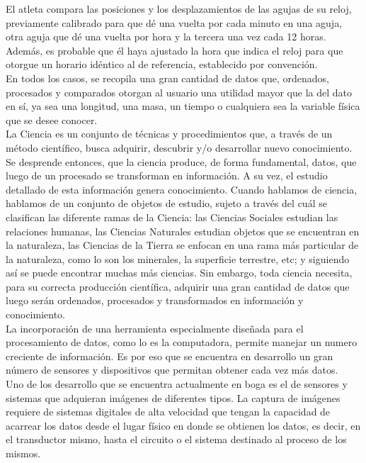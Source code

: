 El atleta compara las posiciones y los desplazamientos de las agujas de su reloj, previamente calibrado para que dé una vuelta por cada minuto en una aguja, otra aguja que dé una vuelta por hora y la tercera una vez cada 12 horas. Además, es probable que él haya ajustado la hora que indica el reloj para que otorgue un horario idéntico al de referencia, establecido por convención.\\

En todos los casos, se recopila una gran cantidad de datos que, ordenados, procesados y comparados otorgan al usuario una utilidad mayor que la del dato en sí, ya sea una longitud, una masa, un tiempo o cualquiera sea la variable física que se desee conocer.\\

La Ciencia es un conjunto de técnicas y procedimientos que, a través de un método científico, busca adquirir, descubrir y/o desarrollar nuevo conocimiento. Se desprende entonces, que la ciencia produce, de forma fundamental, datos, que luego de un procesado se transforman en información. A su vez, el estudio detallado de esta información genera conocimiento. Cuando hablamos de ciencia, hablamos de un conjunto de objetos de estudio, sujeto a través del cuál se clasifican las diferente ramas de la Ciencia: las Ciencias Sociales estudian las relaciones humanas, las Ciencias Naturales estudian objetos que se encuentran en la naturaleza, las Ciencias de la Tierra se enfocan en una rama más particular de la naturaleza, como lo son los minerales, la superficie terrestre, etc; y siguiendo así se puede encontrar muchas más ciencias. Sin embargo, toda ciencia necesita, para su correcta producción científica, adquirir una gran cantidad de datos que luego serán ordenados, procesados y transformados en información y conocimiento.\\

La incorporación de una herramienta especialmente diseñada para el procesamiento de datos, como lo es la computadora, permite manejar un numero creciente de información.
Es por eso que se encuentra en desarrollo un gran número de sensores y dispositivos que permitan obtener cada vez más datos.\\

Uno de los desarrollo que se encuentra actualmente en boga es el de sensores y sistemas que adquieran imágenes de diferentes tipos. La captura de imágenes requiere de sistemas digitales de alta velocidad que tengan la capacidad de acarrear los datos desde el lugar físico en donde se obtienen los datos, es decir, en el transductor mismo, hasta el circuito o el sistema destinado al proceso de los mismos.\\

